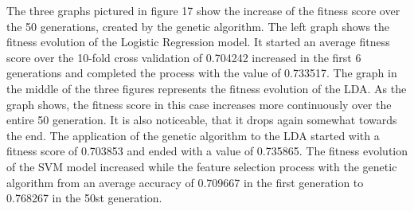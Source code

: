 \documentclass[../masterarbeit.tex]{subfiles}
\begin{document}
The three graphs pictured in figure 17 show the increase of the fitness score over the 50 generations, created by the genetic algorithm. The left graph shows the fitness evolution of the Logistic Regression model. It started an average fitness score over the 10-fold cross validation of 0.704242 increased in the first 6 generations and completed the process with the value of 0.733517. The graph in the middle of the three figures represents the fitness evolution of the LDA. As the graph shows, the fitness score in this case increases more continuously over the entire 50 generation. It is also noticeable,  that it drops again somewhat towards the end. The application of the genetic algorithm to the LDA started with a fitness score of 0.703853 and ended with a value of 0.735865. The fitness evolution of the SVM model increased while the feature selection process with the genetic algorithm from an average accuracy of 0.709667 in the first generation to 0.768267 in the 50st generation.\\
\end{document}
